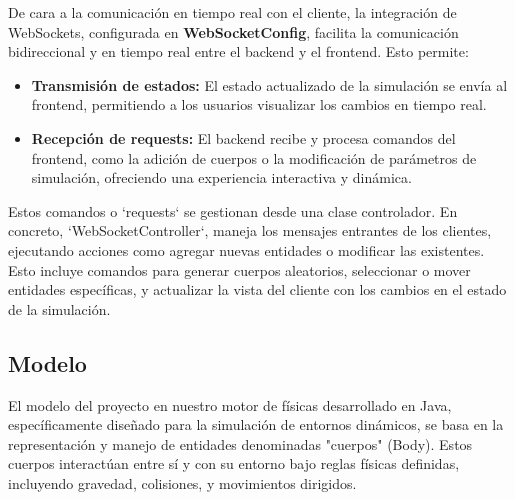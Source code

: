 De cara a la comunicación en tiempo real con el cliente, la integración de WebSockets, configurada en \textbf{WebSocketConfig}, facilita la comunicación bidireccional y en tiempo real entre el backend y el frontend. 
Esto permite:
\begin{itemize}
    \item \textbf{Transmisión de estados:} El estado actualizado de la simulación se envía al frontend, permitiendo a los usuarios visualizar los cambios en tiempo real.
    \item \textbf{Recepción de requests:} El backend recibe y procesa comandos del frontend, como la adición de cuerpos o la modificación de parámetros de simulación, ofreciendo una experiencia interactiva y dinámica.
\end{itemize}
Estos comandos o `requests` se gestionan desde una clase controlador. En concreto, `WebSocketController`, maneja los mensajes entrantes de los clientes, ejecutando acciones como agregar nuevas entidades o modificar las existentes. Esto incluye comandos para generar cuerpos aleatorios, seleccionar o mover entidades específicas, y actualizar la vista del cliente con los cambios en el estado de la simulación.

\subsection{Modelo}
El modelo del proyecto en nuestro motor de físicas desarrollado en Java, específicamente diseñado para la simulación de entornos dinámicos, se basa en la representación y manejo de entidades denominadas "cuerpos" (Body). Estos cuerpos interactúan entre sí y con su entorno bajo reglas físicas definidas, incluyendo gravedad, colisiones, y movimientos dirigidos.
